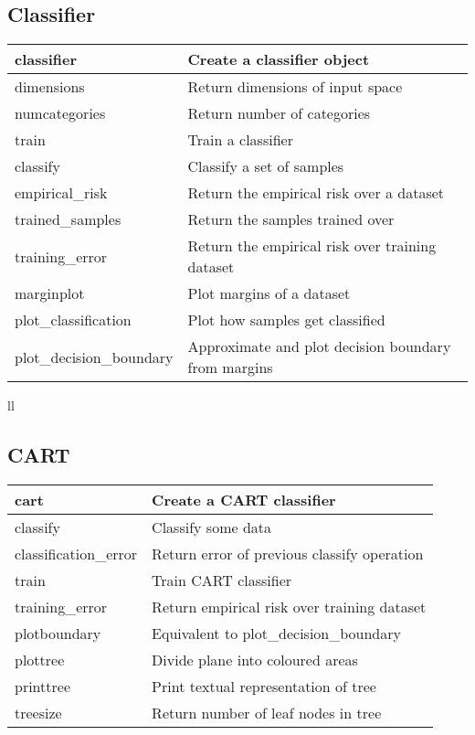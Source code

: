 \subsection{Classifier}

\begin{tabular}{ll}
\hline
classifier		& Create a classifier object \\
\hline	
dimensions		& Return dimensions of input space \\		
numcategories		& Return number of categories \\
\hline
train			& Train a classifier \\
classify		& Classify a set of samples \\
empirical\_risk		& Return the empirical risk over a dataset \\
\hline
trained\_samples		& Return the samples trained over \\
training\_error		& Return the empirical risk over training dataset \\
\hline
marginplot		& Plot margins of a dataset \\
plot\_classification	& Plot how samples get classified \\
plot\_decision\_boundary	& Approximate and plot decision boundary from margins \\
\hline
\end{tabular}{ll}


\subsection{CART}

\begin{tabular}{ll}
\hline
cart			& Create a CART classifier \\
\hline
classify		& Classify some data \\
classification\_error	& Return error of previous classify operation \\
\hline
train			& Train CART classifier \\
training\_error		& Return empirical risk over training dataset \\
\hline
plotboundary		& Equivalent to plot\_decision\_boundary \\
plottree		& Divide plane into coloured areas \\
printtree		& Print textual representation of tree \\
treesize		& Return number of leaf nodes in tree \\
\hline
\end{tabular}

